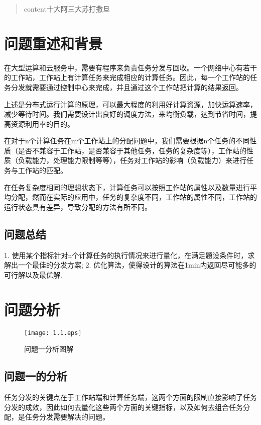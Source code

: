 \documentclass{MathorCupmodeling}
\begin{document}
	\begin{abstract}
		content十大阿三大苏打撒旦%
	\end{abstract}

	\newpage


	\tableofcontents

	\newpage

	\section{问题重述和背景}		%

在大型运算和云服务中，需要有程序来负责任务分发与回收。一个网络中心有若干的工作站，工作站上有计算任务来完成相应的计算任务。因此，每一个工作站的任务分发就需要通过控制中心来完成，并且通过这个工作站把计算的结果返回。

上述是分布式运行计算的原理，可以最大程度的利用好计算资源，加快运算速率，减少等待时间。我们需要设计出良好的调度方法，来均衡负载，达到节省时间，提高资源利用率的目的。

在对于n个计算任务在m个工作站上的分配问题中，我们需要根据n个任务的不同性质（是否不兼容于工作站，是否兼容于其他任务，任务的复杂度等），工作站的性质（负载能力，处理能力限制等等），任务对工作站的影响（负载能力）来进行任务与工作站的匹配。

在任务复杂度相同的理想状态下，计算任务可以按照工作站的属性以及数量进行平均分配，然而在实际的应用中，任务的复杂度不同，工作站的属性不同，工作站的运行状态具有差异，导致分配的方法有所不同。

\subsection{问题总结}

1. 使用某个指标针对n个计算任务的执行情况来进行量化，在满足题设条件时，求解出一个最佳的分发方案;
2. 优化算法，使得设计的算法在1min内返回尽可能多的可行解以及最优解.

	\section{问题分析}	

	\begin{figure}[h]%
	\centering
	\texttt{[image: 1.1.eps]} %
	\centering
  	\caption{问题一分析图解}%
	\end{figure}

	\subsection{问题一的分析}
任务分发的关键点在于工作站端和计算任务端，这两个方面的限制直接影响了任务分发的成效，因此如何去量化这些两个方面的关键指标，以及如何去组合任务分配，是任务分发需要解决的问题。
\end{document}
